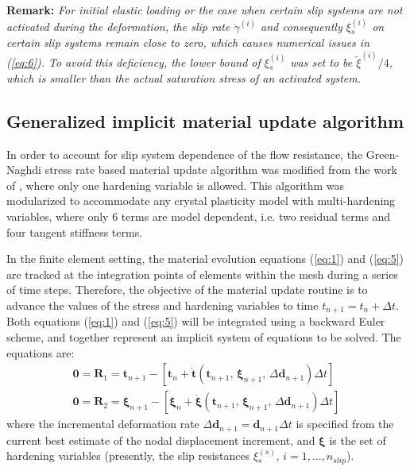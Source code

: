 \documentclass[review]{elsarticle}
\begin{document}
	\textbf{Remark:} \textit{For initial elastic loading or the case when certain slip systems are not activated during the deformation, the slip rate $\dot{\gamma}^{(i)}$ and consequently $\xi{_s^{(i)}}$ on certain slip systems remain close to zero, which causes numerical issues in (\ref{eq:6}).
	To avoid this deficiency, the lower bound of $\xi{_s^{(i)}}$ was set to be $\tilde{\xi}^{(i)}/4$, which is smaller than the actual saturation stress of an activated system.}
	\subsection{Generalized implicit material update algorithm}	
	In order to account for slip system dependence of the flow resistance, the Green-Naghdi stress rate based material update algorithm was modified from the work of \cite{r22}, where only one hardening variable is allowed.
	This algorithm was modularized to accommodate any crystal plasticity model with multi-hardening variables, where only 6 terms are model dependent, i.e. two residual terms and four tangent stiffness terms. 
	
	In the finite element setting, the material evolution equations (\ref{eq:1}) and (\ref{eq:5}) are tracked at the integration points of elements within the mesh during a series of time steps.
	Therefore, the objective of the material update routine is to advance the values of the stress and hardening variables to time $t_{n+1} = t_n + \Delta t$.
	Both equations (\ref{eq:1}) and (\ref{eq:5}) will be integrated using a backward Euler scheme, and together represent an implicit system of equations to be solved.
	The equations are:
	\begin{gather}
	\mathbf{0} = \mathbf{R}_1 = \mathbf{t}_{n+1} - \left[ \mathbf{t}_n + \mathbf{\dot{t}} \left( \mathbf{t}_{n+1},\, \bm{\xi}_{n+1},\, \Delta\mathbf{d}_{n+1} \right) \Delta t \right] 
	\label{eq:7} \\
	\mathbf{0} = \mathbf{R}_2 = \bm{\xi}_{n+1} - \left[ \bm{\xi}_n + \bm{\dot{\xi}} \left( \mathbf{t}_{n+1},\, \bm{\xi}_{n+1},\, \Delta\mathbf{d}_{n+1} \right) \Delta t \right] 
	\label{eq:8}
	\end{gather}
	where the incremental deformation rate $\Delta \mathbf{d}_{n+1} = \mathbf{d}_{n+1} \Delta t$ is specified from the current best estimate of the nodal displacement increment, and $\bm{\xi}$ is the set of hardening variables (presently, the slip resistances $\xi{_s^{(s)}} ,\, i=1,\ldots , n_{slip}$).
	
\end{document}
